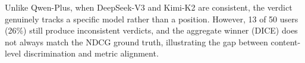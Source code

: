 \documentclass[pdflatex,sn-basic,referee,lineno]{sn-jnl}
\begin{document}
Unlike Qwen-Plus, when DeepSeek-V3 and Kimi-K2 are consistent, the verdict genuinely tracks a specific model rather than a position. However, 13 of 50 users (26\%) still produce inconsistent verdicts, and the aggregate winner (DICE) does not always match the NDCG ground truth, illustrating the gap between content-level discrimination and metric alignment.
\end{document}
